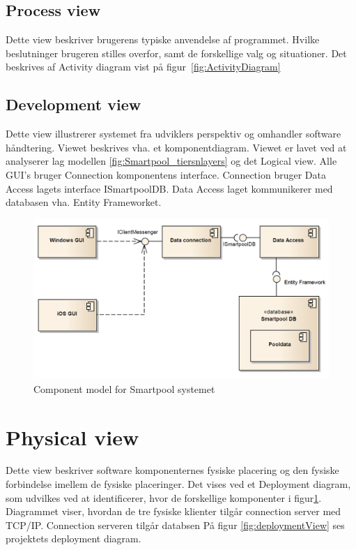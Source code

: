 \subsection{Process view}
Dette view beskriver brugerens typiske anvendelse af programmet. Hvilke beslutninger brugeren stilles overfor, samt de forskellige valg og situationer. Det beskrives af Activity diagram vist på figur~\ref{fig:ActivityDiagram}

\subsection{Development view}
Dette view illustrerer systemet fra udviklers perspektiv og omhandler software håndtering. Viewet beskrives vha. et komponentdiagram. Viewet er lavet ved at analyserer lag modellen \ref{fig:Smartpool_tiersnlayers} og det Logical view. Alle GUI's bruger Connection komponentens interface. Connection bruger Data Access lagets interface ISmartpoolDB. Data Access laget kommunikerer med databasen vha. Entity Frameworket.

\begin{figure}
\centering
\includegraphics[width=0.7\linewidth]{figs/arkitektur/componentModel}
\caption{Component model for Smartpool systemet}
\label{fig:componentModel}
\end{figure}

\section{Physical view}
Dette view beskriver software komponenternes fysiske placering og den fysiske forbindelse imellem de fysiske placeringer. Det vises ved et Deployment diagram, som udvilkes ved at identificerer, hvor de forskellige komponenter i figur\ref{fig:componentModel}. Diagrammet viser, hvordan de tre fysiske klienter tilgår connection server med TCP/IP. Connection serveren tilgår databsen 
På figur \ref{fig:deploymentView} ses projektets deployment diagram.

